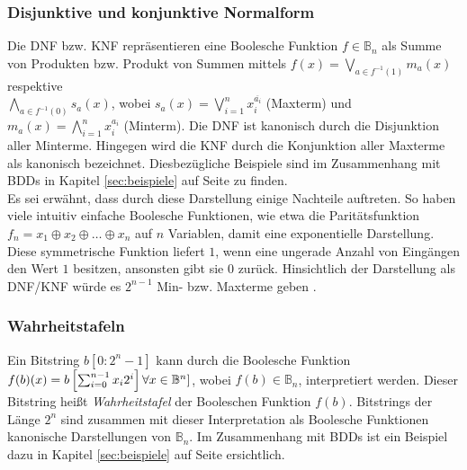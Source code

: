 \subsubsection{Disjunktive und konjunktive Normalform}
\label{sec:dnfknf}
Die DNF bzw. KNF repräsentieren eine Boolesche Funktion $f \in \mathbb{B}_n$ als Summe von Produkten bzw. Produkt von Summen mittels $f(x) = \bigvee_{a \in f^{-1}(1)}m_a(x)$ respektive\\ $\bigwedge_{a \in f^{-1}(0)}s_a(x)$, wobei $s_a(x) = \bigvee_{i=1}^n x_i^{\overline{a_i}}$ (Maxterm) und $m_a(x) = \bigwedge_{i=1}^n x_i^{a_i}$ (Minterm). Die DNF ist kanonisch durch die Disjunktion aller Minterme. Hingegen wird die KNF durch die Konjunktion aller Maxterme als kanonisch bezeichnet. Diesbezügliche Beispiele sind im Zusammenhang mit BDDs in Kapitel \ref{sec:beispiele} auf Seite \pageref{sec:beispiele} zu finden.\\
Es sei erwähnt, dass durch diese Darstellung einige Nachteile auftreten. So haben viele intuitiv einfache Boolesche Funktionen, wie etwa die Paritätsfunktion $f_n = x_1 \oplus x_2 \oplus \dots \oplus x_n$ auf $n$ Variablen, damit eine exponentielle Darstellung. Diese symmetrische Funktion liefert $1$, wenn eine ungerade Anzahl von Eingängen den Wert $1$ besitzen, ansonsten gibt sie $0$ zurück. Hinsichtlich der Darstellung als DNF/KNF würde es $2^{n-1}$ Min- bzw. Maxterme geben \cite[S.21]{h2002}.

\subsubsection{Wahrheitstafeln}
\label{sec:wahrheitstafeln}
Ein Bitstring $b[0 : 2^n - 1]$ kann durch die Boolesche Funktion $f(b)(x) = b \left[ \sum_{i=0}^{n-1} x_i 2^i \right] \forall x \\\in \mathbb{B}^n]$, wobei $f(b) \in \mathbb{B}_n$, interpretiert werden. Dieser Bitstring heißt \emph{Wahrheitstafel} der Booleschen Funktion $f(b)$. Bitstrings der Länge $2^n$ sind zusammen mit dieser Interpretation als Boolesche Funktionen kanonische Darstellungen von $\mathbb{B}_n$. Im Zusammenhang mit BDDs ist ein Beispiel dazu in Kapitel \ref{sec:beispiele} auf Seite \pageref{sec:beispiele} ersichtlich.

